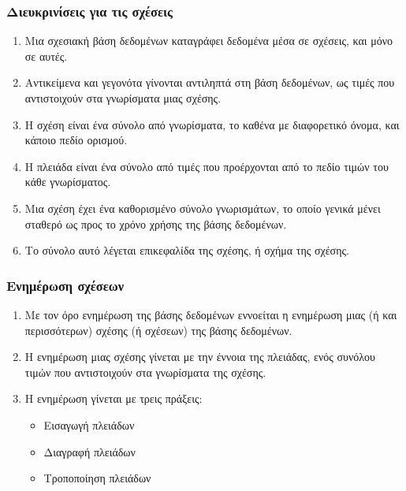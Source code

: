 \begin{frame}
\frametitle{Διευκρινίσεις για τις σχέσεις}
\begin{minipage}{\wE}
  \pause
  \begin{enumerate}[<+->] \itemsep 3pt
    \item Μια σχεσιακή βάση δεδομένων καταγράφει δεδομένα μέσα σε {\crr σχέσεις}, 
          και μόνο σε αυτές.
    \item Αντικείμενα και γεγονότα γίνονται αντιληπτά στη βάση δεδομένων,
          ως τιμές που αντιστοιχούν στα {\crr γνωρίσματα} μιας σχέσης.
    \item Η σχέση είναι ένα {\crr σύνολο από γνωρίσματα}, το καθένα με διαφορετικό όνομα,
          και κάποιο πεδίο ορισμού.
    \item Η πλειάδα είναι ένα {\crr σύνολο από τιμές} που προέρχονται από το πεδίο τιμών του κάθε γνωρίσματος.
    \item Μια σχέση έχει ένα καθορισμένο σύνολο γνωρισμάτων, 
          το οποίο γενικά μένει σταθερό ως προς το χρόνο χρήσης
          της βάσης δεδομένων.
    \item Το σύνολο αυτό λέγεται επικεφαλίδα της σχέσης, ή {\crr σχήμα της σχέσης}. 
  \end{enumerate}
\end{minipage}
\end{frame}


\begin{frame}
\frametitle{Ενημέρωση σχέσεων}
\begin{minipage}{\wE}
  \pause
  \begin{enumerate}[<+->] \itemsep 6pt
    \item Με τον όρο {\crr ενημέρωση} της  βάσης δεδομένων εννοείται η ενημέρωση μιας
         (ή και περισσότερων) σχέσης (ή σχέσεων) της βάσης δεδομένων.
    \item Η ενημέρωση μιας σχέσης γίνεται με την έννοια της {\crr πλειάδας},
          ενός συνόλου τιμών που αντιστοιχούν στα γνωρίσματα της σχέσης.
    \item Η ενημέρωση γίνεται με τρεις πράξεις:
          \begin{itemize}
            \item Εισαγωγή πλειάδων
            \item Διαγραφή πλειάδων
            \item Τροποποίηση πλειάδων
          \end{itemize}
  \end{enumerate}
\end{minipage}
\end{frame}



